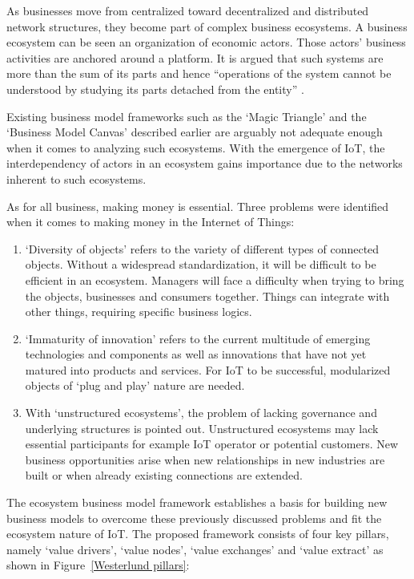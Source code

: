 		As businesses move from centralized toward decentralized and distributed network structures, they become part of complex business ecosystems. A business ecosystem can be seen an organization of economic actors. Those actors' business activities are anchored around a platform. It is argued that such systems are more than the sum of its parts and hence ``operations of the system cannot be understood by studying its parts detached from the entity'' \cite[p.~6]{westerlund}.

		Existing business model frameworks such as the `Magic Triangle' and the `Business Model Canvas' described earlier are arguably not adequate enough when it comes to analyzing such ecosystems. With the emergence of IoT, the interdependency of actors in an ecosystem gains importance due to the networks inherent to such ecosystems.

		As for all business, making money is essential. Three problems were identified  when it comes to making money in the Internet of Things:

		\begin{enumerate}
			\item `Diversity of objects' refers to the variety of different types of connected objects. Without a widespread standardization, it will be difficult to be efficient in an ecosystem. Managers will face a difficulty when trying to bring the objects, businesses and consumers together. Things can integrate with other things, requiring specific business logics.

			\item `Immaturity of innovation' refers to the current multitude of emerging technologies and components as well as innovations that have not yet matured into products and services. For IoT to be successful, modularized objects of `plug and play' nature are needed.

			\item With `unstructured ecosystems', the problem of lacking governance and underlying structures is pointed out. Unstructured ecosystems may lack essential participants for example IoT operator or potential customers. New business opportunities arise when new relationships in new industries are built or when already existing connections are extended.
		\end{enumerate}

		The ecosystem business model framework establishes a basis for building new business models to overcome these previously discussed problems and fit the ecosystem nature of IoT. The proposed framework consists of four key pillars, namely `value drivers', `value nodes', `value exchanges' and `value extract' as shown in Figure~\ref{Westerlund pillars}:

